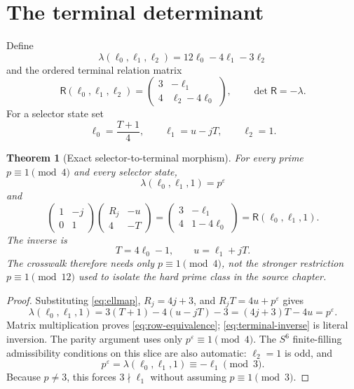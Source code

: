 \documentclass[11pt]{article}
\newtheorem{theorem}{Theorem}[section]
\theoremstyle{definition}
\theoremstyle{remark}
\begin{document}
\section{The terminal determinant}

Define
\begin{equation}\label{eq:lambda}
 \lambda(\ell_0,\ell_1,\ell_2)
 =12\ell_0-4\ell_1-3\ell_2
\end{equation}
and the ordered terminal relation matrix
\begin{equation}\label{eq:Rterminal}
 \mathsf R(\ell_0,\ell_1,\ell_2)
 =\begin{pmatrix}3&-\ell_1\\4&\ell_2-4\ell_0\end{pmatrix},
 \qquad
 \det\mathsf R=-\lambda.
\end{equation}
For a selector state set
\begin{equation}\label{eq:ellmap}
 \ell_0=\frac{T+1}{4},
 \qquad
 \ell_1=u-jT,
 \qquad
 \ell_2=1.
\end{equation}

\begin{theorem}[Exact selector-to-terminal morphism]\label{thm:terminal}
For every prime $p\equiv1\pmod4$ and every selector state,
\begin{equation}\label{eq:lambda-pe}
 \lambda(\ell_0,\ell_1,1)=p^\varepsilon
\end{equation}
and
\begin{equation}\label{eq:row-equivalence}
 \begin{pmatrix}1&-j\\0&1\end{pmatrix}
 \begin{pmatrix}R_j&-u\\4&-T\end{pmatrix}
 =
 \begin{pmatrix}3&-\ell_1\\4&1-4\ell_0\end{pmatrix}
 =\mathsf R(\ell_0,\ell_1,1).
\end{equation}
The inverse is
\begin{equation}\label{eq:terminal-inverse}
 T=4\ell_0-1,
 \qquad
 u=\ell_1+jT.
\end{equation}
The crosswalk therefore needs only $p\equiv1\pmod4$, not the stronger
restriction $p\equiv1\pmod{12}$ used to isolate the hard prime class in the
source chapter.
\end{theorem}

\begin{proof}
Substituting \eqref{eq:ellmap}, $R_j=4j+3$, and
$R_jT=4u+p^\varepsilon$ gives
\[
 \lambda(\ell_0,\ell_1,1)
 =3(T+1)-4(u-jT)-3
 =(4j+3)T-4u=p^\varepsilon.
\]
Matrix multiplication proves \eqref{eq:row-equivalence};
\eqref{eq:terminal-inverse} is literal inversion.  The parity argument uses
only $p^\varepsilon\equiv1\pmod4$.  The $S^6$ finite-filling admissibility
conditions on this slice are also automatic: $\ell_2=1$ is odd, and
\[
 p^\varepsilon=\lambda(\ell_0,\ell_1,1)
 \equiv-\ell_1\pmod3.
\]
Because $p\ne3$, this forces $3\nmid\ell_1$ without assuming
$p\equiv1\pmod3$.
\end{proof}
\end{document}
